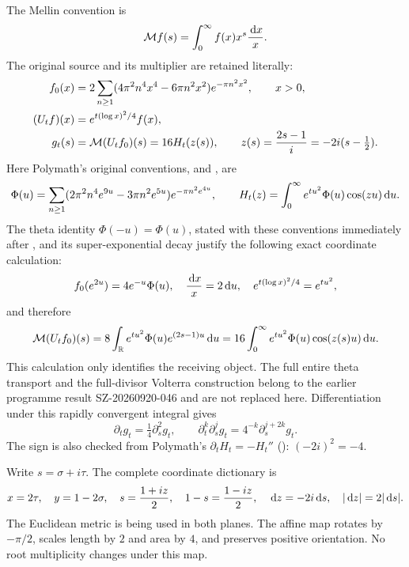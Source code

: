 The Mellin convention is
\[
 \mathcal M f(s)=\int_0^\infty f(x)x^s\frac{\,\mathrm d x}{x}.
\]
The original source and its multiplier are retained literally:
\begin{equation}\label{pmreceiver:PMH1-objects}
\begin{split}
 f_0(x)&=2\sum_{n\ge1}
 (4\pi^2n^4x^4-6\pi n^2x^2)e^{-\pi n^2x^2},\qquad x>0,\\
 (U_tf)(x)&=e^{t(\log x)^2/4}f(x),\\
 g_t(s)&=\mathcal M(U_tf_0)(s)=16H_t(z(s)),\qquad
 z(s)=\frac{2s-1}{i}=-2i(s-\tfrac12).
\end{split}
\end{equation}
Here Polymath's original conventions,  and , are
\begin{equation}\label{pmreceiver:PMH1-Phi}
 \Phi(u)=\sum_{n\ge1}(2\pi^2n^4e^{9u}-3\pi n^2e^{5u})
 e^{-\pi n^2e^{4u}},\qquad
 H_t(z)=\int_0^\infty e^{tu^2}\Phi(u)\cos(zu)\,\mathrm d u.
\end{equation}
The theta identity $\Phi(-u)=\Phi(u)$, stated with these conventions
immediately after , and its super-exponential decay justify
the following exact coordinate calculation:
\[
 f_0(e^{2u})=4e^{-u}\Phi(u),\quad
 \frac{\,\mathrm d x}{x}=2\,\mathrm d u,\quad
 e^{t(\log x)^2/4}=e^{tu^2},
\]
and therefore
\[
 \mathcal M(U_tf_0)(s)
 =8\int_\mathbb R e^{tu^2}\Phi(u)e^{(2s-1)u}\,\mathrm d u
 =16\int_0^\infty e^{tu^2}\Phi(u)\cos(z(s)u)\,\mathrm d u.
\]
This calculation only identifies the receiving object. The full entire
theta transport and the full-divisor Volterra construction belong to
the earlier programme result SZ-20260920-046 and are not replaced here.
Differentiation under this rapidly convergent integral gives
\begin{equation}\label{pmreceiver:PMH1-heat}
 \partial_tg_t=\tfrac14\partial_s^2g_t,
 \qquad \partial_t^k\partial_s^jg_t
 =4^{-k}\partial_s^{j+2k}g_t.
\end{equation}
The sign is also checked from Polymath's $\partial_tH_t=-H_t''$
(): $(-2i)^2=-4$.

Write $s=\sigma+i\tau$. The complete coordinate dictionary is
\begin{equation}\label{pmreceiver:PMH1-coordinate}
 x=2\tau,\quad y=1-2\sigma,\quad
 s=\frac{1+iz}{2},\quad 1-s=\frac{1-iz}{2},\quad
 \,\mathrm d z=-2i\,\mathrm d s,\quad |\,\mathrm d z|=2|\,\mathrm d s|.
\end{equation}
The Euclidean metric is being used in both planes. The affine map
rotates by $-\pi/2$, scales length by $2$ and area by $4$, and preserves
positive orientation. No root multiplicity changes under this map.

